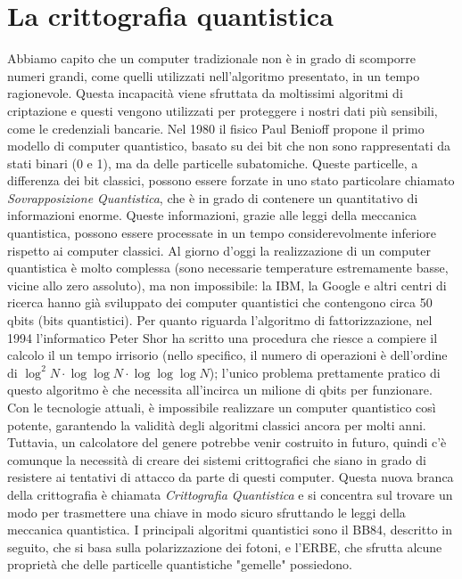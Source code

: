\documentclass[italian,A4,12pt]{article}
\begin{document}
  \section{La crittografia quantistica}
    Abbiamo capito che un computer tradizionale non è in grado di scomporre numeri grandi, come quelli utilizzati nell'algoritmo presentato, in un tempo ragionevole. Questa incapacità viene sfruttata da moltissimi algoritmi di criptazione e questi vengono utilizzati per proteggere i nostri dati più sensibili, come le credenziali bancarie.
    Nel 1980 il fisico Paul Benioff propone il primo modello di computer quantistico, basato su dei bit che non sono rappresentati da stati binari (0 e 1), ma da delle particelle subatomiche.
    Queste particelle, a differenza dei bit classici, possono essere forzate in uno stato particolare chiamato \textit{Sovrapposizione Quantistica}, che è in grado di contenere un quantitativo di informazioni enorme.
    Queste informazioni, grazie alle leggi della meccanica quantistica, possono essere processate in un tempo considerevolmente inferiore rispetto ai computer classici.
    Al giorno d'oggi la realizzazione di un computer quantistica è molto complessa (sono necessarie temperature estremamente basse, vicine allo zero assoluto), ma non impossibile: la IBM, la Google e altri centri di ricerca hanno già sviluppato dei computer quantistici che contengono circa 50 qbits (bits quantistici).
    Per quanto riguarda l'algoritmo di fattorizzazione, nel 1994 l'informatico Peter Shor ha scritto una procedura che riesce a compiere il calcolo il un tempo irrisorio (nello specifico, il numero di operazioni è dell'ordine di $\log^2{N}\cdot\log{\log{N}}\cdot\log{\log{\log{N}}}$); l'unico problema prettamente pratico di questo algoritmo è che necessita all'incirca un milione di qbits per funzionare.
    Con le tecnologie attuali, è impossibile realizzare un computer quantistico così potente, garantendo la validità degli algoritmi classici ancora per molti anni. Tuttavia, un calcolatore del genere potrebbe venir costruito in futuro, quindi c'è comunque la necessità di creare dei sistemi crittografici che siano in grado di resistere ai tentativi di attacco da parte di questi computer.
    Questa nuova branca della crittografia è chiamata \textit{Crittografia Quantistica} e si concentra sul trovare un modo per trasmettere una chiave in modo sicuro sfruttando le leggi della meccanica quantistica.
    I principali algoritmi quantistici sono il BB84, descritto in seguito, che si basa sulla polarizzazione dei fotoni, e l'ERBE, che sfrutta alcune proprietà che delle particelle quantistiche "gemelle" possiedono.
\end{document}
